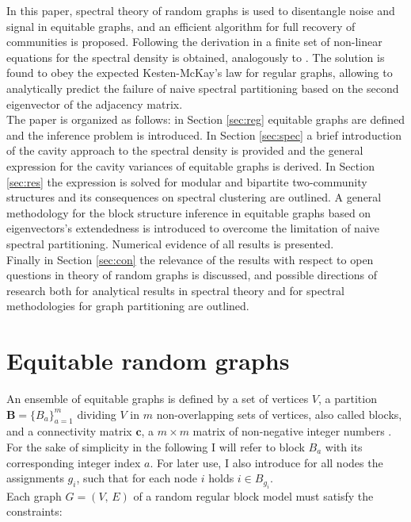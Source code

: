 \documentclass[%
 reprint,
 amsmath,amssymb,
 aps,
 pre,
 showpacs
]{revtex4-1}
\begin{document}
In this paper, spectral theory of random graphs is used to disentangle noise and signal in equitable graphs, and an efficient algorithm for full recovery of communities is proposed. Following the derivation in \cite{rogers2008cavity} a finite set of non-linear equations for the spectral density is obtained, analogously to \cite{newman2014equitable}. The solution is found to obey the expected Kesten-McKay's law for regular graphs, allowing to analytically predict the failure of naive spectral partitioning based on the second eigenvector of the adjacency matrix.\\
The paper is organized as follows: in Section \ref{sec:reg} equitable graphs are defined and the inference problem is introduced. In Section \ref{sec:spec} a brief introduction of the cavity approach to the spectral density is provided and the general expression for the cavity variances of equitable graphs is derived. In Section \ref{sec:res} the expression is solved for modular and bipartite two-community structures and its consequences on spectral clustering are outlined. A general methodology for the block structure inference in equitable graphs based on eigenvectors's extendedness is introduced to overcome the limitation of naive spectral partitioning. Numerical evidence of all results is presented. \\ Finally in Section \ref{sec:con} the relevance of the results with respect to open questions in theory of random graphs is discussed, and possible directions of research both for analytical results in spectral theory and for spectral methodologies for graph partitioning are outlined.

\section{\label{sec:reg}Equitable random graphs}

An ensemble of equitable graphs is defined by a set of vertices $V$, a partition $\mathbf{B}=\{B_a\}_{a=1}^m$ dividing $V$ in $m$ non-overlapping sets of vertices, also called blocks, and a connectivity matrix $\mathbf{c}$, a $m\times m$ matrix of non-negative integer numbers \cite{peixoto2016nonparametric}. For the sake of simplicity in the following I will refer to block $B_a$ with its corresponding integer index $a$. For later use, I also introduce for all nodes the assignments $g_i$, such that for each node $i$ holds $i\in B_{g_i}$. \\ 
Each graph $G=(V,\,E)$ of a random regular block model must satisfy the constraints:
\end{document}
